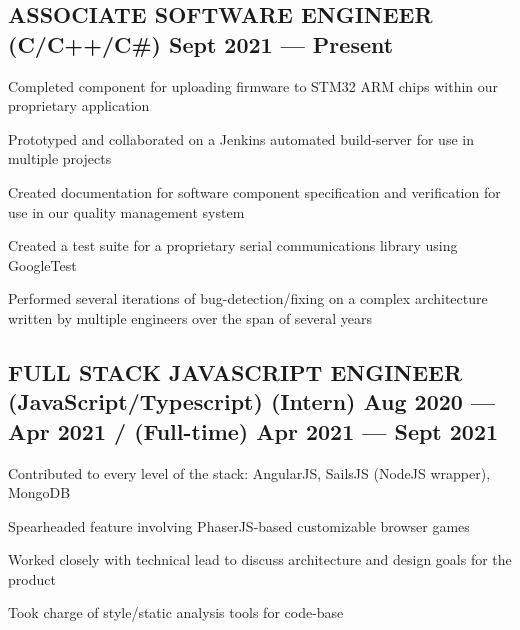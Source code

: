 \documentclass[letter,10pt]{article}
\begin{document}
\subsection{{ASSOCIATE SOFTWARE ENGINEER (C/C++/C\#) \texorpdfstring{\hfill}{\space} Sept 2021 --- Present}}
\begin{zitemize}
\item Completed component for uploading firmware to STM32 ARM chips within our proprietary application
\item Prototyped and collaborated on a Jenkins automated build-server for use in multiple projects
\item Created documentation for software component specification and verification for use in our quality management system
\item Created a test suite for a proprietary serial communications library using GoogleTest
\item Performed several iterations of bug-detection/fixing on a complex architecture written by multiple engineers over the span of several years
\end{zitemize}

\subsection{{FULL STACK JAVASCRIPT ENGINEER (JavaScript/Typescript) \texorpdfstring{\hfill}{\space} (Intern) Aug 2020 --- Apr 2021 / (Full-time) Apr 2021 --- Sept 2021}}
\begin{zitemize}
\item Contributed to every level of the stack: AngularJS, SailsJS (NodeJS wrapper), MongoDB
\item Spearheaded feature involving PhaserJS-based customizable browser games
\item Worked closely with technical lead to discuss architecture and design goals for the product
\item Took charge of style/static analysis tools for code-base
\end{zitemize}

\end{document}
